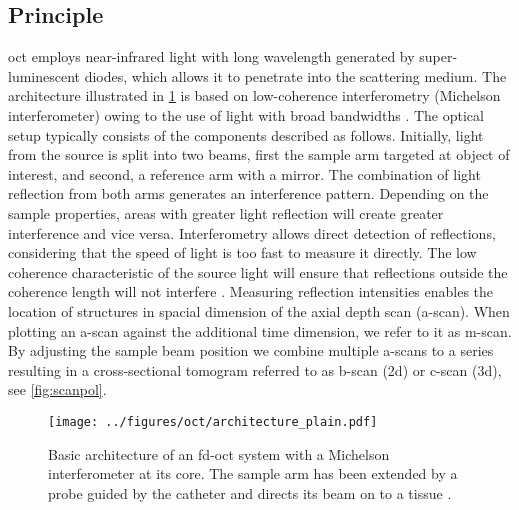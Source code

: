 \subsection{Principle}

\acrshort{oct} employs near-infrared light with long wavelength generated by super-luminescent diodes, which allows it to penetrate into the scattering medium. The architecture illustrated in \cref{fig:octarchitecture} is based on low-coherence interferometry (Michelson interferometer) owing to the use of light with broad bandwidths \cite{Drexler.2008, HiramG.Bezerra.2009}. The optical setup typically consists of the components described as follows. Initially, light from the source is split into two beams, first the sample arm targeted at object of interest, and second, a reference arm with a mirror. The combination of light reflection from both arms generates an interference pattern. Depending on the sample properties, areas with greater light reflection will create greater interference and vice versa. Interferometry allows direct detection of reflections, considering that the speed of light is too fast to measure it directly. The low coherence characteristic of the source light will ensure that reflections outside the coherence length will not interfere \cite{Bille.2019}. Measuring reflection intensities enables the location of structures in spacial dimension of the axial depth scan (\Gls{a-scan}). When plotting an \Gls{a-scan} against the additional time dimension, we refer to it as \Gls{m-scan}. By adjusting the sample beam position we combine multiple \Glspl{a-scan} to a series resulting in a cross-sectional tomogram referred to as \Gls{b-scan} (\acrshort{2d}) or \Gls{c-scan} (\acrshort{3d}), see \cref{fig:scanpol}. \cite{Drexler.2008, Bille.2019}
\begin{figure}
  \centering
  \texttt{[image: ../figures/oct/architecture\_plain.pdf]}
  \caption[\acrshort{oct} architecture]{Basic architecture of an \acrshort{fd-oct} system with a Michelson interferometer \cite{Drexler.2008} at its core. The sample arm has been extended by a probe guided by the catheter and directs its beam on to a tissue \cite{Bahoshy.2022}.  }
  \label{fig:octarchitecture}
\end{figure}

